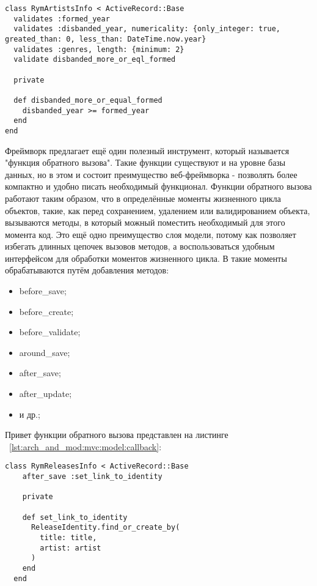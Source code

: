 \begin{lstlisting}[style=fsharpstyle,caption={Реализация валидации в классе RymArtistsInfo}, label=lst:arch_and_mod:mvc:model:rym_artists_info_validations]
class RymArtistsInfo < ActiveRecord::Base
  validates :formed_year
  validates :disbanded_year, numericality: {only_integer: true, greated_than: 0, less_than: DateTime.now.year}
  validates :genres, length: {minimum: 2}
  validate disbanded_more_or_eql_formed

  private

  def disbanded_more_or_equal_formed
    disbanded_year >= formed_year
  end
end
\end{lstlisting}

Фреймворк \ror{} предлагает ещё один полезный инструмент, который называется "функция обратного вызова". Такие функции существуют и на уровне базы данных, но в этом и состоит преимущество веб-фреймворка - позволять более компактно и удобно писать необходимый функционал. Функции обратного вызова работают таким образом, что в определённые моменты жизненного цикла объектов, такие, как перед сохранением, удалением или валидированием объекта, вызываются методы, в который можный поместить необходимый для этого момента код. Это ещё одно преимущество слоя модели, потому как позволяет избегать длинных цепочек вызовов методов, а воспользоваться удобным интерфейсом для обработки моментов жизненного цикла. В \ror{} такие моменты обрабатываются путём добавления методов:
\begin{itemize}
  \item before\_save;
  \item before\_create;
  \item before\_validate;
  \item around\_save;
  \item after\_save;
  \item after\_update;
  \item и др.;
\end{itemize}

Привет функции обратного вызова представлен на листинге ~\ref{lst:arch_and_mod:mvc:model:callback}:

\begin{lstlisting}[style=fsharpstyle,caption={Пример получения артистов по определённым параметрам}, label=lst:arch_and_mod:mvc:model:callback]
  class RymReleasesInfo < ActiveRecord::Base
    after_save :set_link_to_identity

    private

    def set_link_to_identity
      ReleaseIdentity.find_or_create_by(
        title: title,
        artist: artist
      )
    end
  end
\end{lstlisting}

